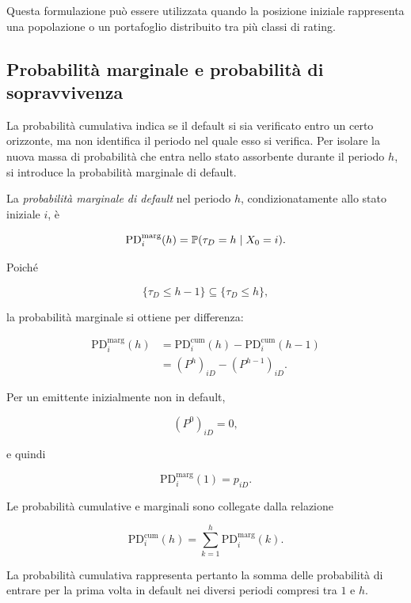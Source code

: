 Questa formulazione pu\`{o} essere utilizzata quando la posizione
iniziale rappresenta una popolazione o un portafoglio distribuito tra
pi\`{u} classi di rating.

\subsection{Probabilit\`{a} marginale e probabilit\`{a} di
sopravvivenza}

\label{subsec:cap9-pd-marginale-sopravvivenza}

La probabilit\`{a} cumulativa indica se il default si sia verificato
entro un certo orizzonte, ma non identifica il periodo nel quale esso
si verifica. Per isolare la nuova massa di probabilit\`{a} che entra
nello stato assorbente durante il periodo $h$, si introduce la
probabilit\`{a} marginale di default.

\begin{definition}
La \emph{probabilit\`{a} marginale di default} nel periodo $h$,
condizionatamente allo stato iniziale $i$, \`{e}

\[
\mathrm{PD}_{i}^{\mathrm{marg}}(h)
=
\mathbb{P}(\tau_D=h\mid X_0=i).
\]
\end{definition}

Poich\'{e}

\[
\{\tau_D\leq h-1\}
\subseteq
\{\tau_D\leq h\},
\]

la probabilit\`{a} marginale si ottiene per differenza:

\[
\begin{split}
\mathrm{PD}_{i}^{\mathrm{marg}}(h)
&=
\mathrm{PD}_{i}^{\mathrm{cum}}(h)
-
\mathrm{PD}_{i}^{\mathrm{cum}}(h-1)
\\
&=
(P^h)_{iD}
-
(P^{h-1})_{iD}.
\end{split}
\]

Per un emittente inizialmente non in default,

\[
(P^0)_{iD}=0,
\]

e quindi

\[
\mathrm{PD}_{i}^{\mathrm{marg}}(1)
=
p_{iD}.
\]

Le probabilit\`{a} cumulative e marginali sono collegate dalla
relazione

\[
\mathrm{PD}_{i}^{\mathrm{cum}}(h)
=
\sum_{k=1}^{h}
\mathrm{PD}_{i}^{\mathrm{marg}}(k).
\]

La probabilit\`{a} cumulativa rappresenta pertanto la somma delle
probabilit\`{a} di entrare per la prima volta in default nei diversi
periodi compresi tra $1$ e $h$.

